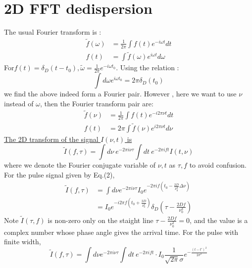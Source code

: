 \documentclass[twocolumn]{aastex61}
\begin{document}
\section{2D FFT dedispersion}
\label{sec:results}
The usual Fourier transform is :
\begin{equation}
\begin{aligned}
\widetilde{f}(\omega) & =\frac{1}{2\pi} \int f(t)e^{-i\omega t}dt \\
 f(t) & = \int \widetilde{f}(\omega)e^{i\omega t}d\omega
 \end{aligned}
\end{equation}
For$ f(t) = \delta _D(t-t_0), \widetilde{\omega} = \frac{1}{2\pi}e^{-i\omega t_0}$. Using the relation :
\begin{equation}
\int d\omega e^{i\omega t_0} = 2\pi \delta _D (t_0)
\end{equation}
we find the above indeed form a Fourier pair. However , here we want to use $\nu$ instead of $\omega$, then the Fourier transform pair are:
\begin{equation}
\begin{aligned}
\widetilde{f} (\nu) &= \frac{1}{2\pi}\int f(t) e^{-i2\pi \nu t}dt \\
f(t) &= 2\pi \int \widetilde{f}(\nu) e^{i2\pi \nu t} d\nu
\end{aligned}
\end{equation}
\underline{ The 2D transform of the signal $I(\nu,t)$ is} 
\begin{equation}
\widetilde{I}(f,\tau)=\int d\nu~e^{-2\pi i \nu \tau} \int dt~e^{-2\pi ift}I(t,\nu)
\end{equation}
where we denote the Fourier conjugate variable of $\nu,t$ as $\tau,f$ to avoid confusion. For the pulse signal given by Eq.(2),
\begin{equation}
\begin{aligned}
\widetilde{I}(f,\tau) &= \int d\nu e^{-2\pi i\nu \tau}I_0 e^{-2\pi i f(t_0 - \frac{2D}{\nu ^3 _0}\Delta \nu)} \\								
								&= I_0 e^{-i2\pi f(t_0 + \frac{2D}{\nu ^2 _0})} 
								\delta_D (\tau - \frac{2Df}{\nu ^3 _0})
\end{aligned}
\end{equation} 
Note $\widetilde{I}(\tau,f)$ is non-zero only on the staight line $\tau - \frac{2Df}{\nu ^2 _0}=0$, and the value is a complex number whose phase angle gives the arrival time. For the pulse with finite width,
\begin{equation}
\widetilde{I}(f,\tau) = \int d\nu e^{-2\pi i \nu \tau}\int dt~e^{-2\pi ift}\cdot I_0 \frac{1}{\sqrt{2\pi}\sigma}e^{-\frac{(t-t')^2}{2\sigma ^2}}
\end{equation}
\end{document}
